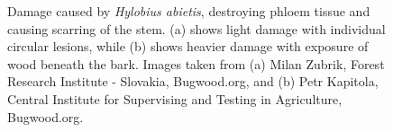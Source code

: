 \documentclass[a4paper, 11pt]{article}
\begin{document}
\begin{figure}[H]
\centering
	\caption{Damage caused by \textit{Hylobius abietis}, destroying phloem tissue and causing scarring of the stem. (a) shows light damage with individual circular lesions, while (b) shows heavier damage with exposure of wood beneath the bark. Images taken from (a) Milan Zubrik, Forest Research Institute - Slovakia, Bugwood.org, and (b) Petr Kapitola, Central Institute for Supervising and Testing in Agriculture, Bugwood.org.}
	\label{damage}
\end{figure}
\end{document}
